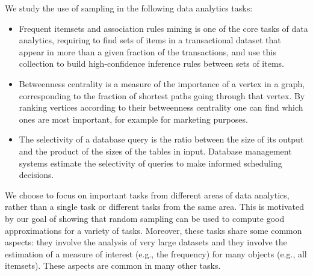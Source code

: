 We study the use of sampling in the following data analytics tasks:
\begin{itemize}
  \item Frequent itemsets and association rules mining is one of the core tasks
    of data analytics, requiring to find sets of items in a transactional
    dataset that appear in more than a given fraction of the transactions, and
    use this collection to build high-confidence inference rules between sets of
    items.
  \item Betweenness centrality is a measure of the importance of a vertex in a
    graph, corresponding to the fraction of shortest paths going through that
    vertex. By ranking vertices according to their betweenness centrality one
    can find which ones are most important, for example for marketing purposes.
  \item The selectivity of a database query is the ratio between the size of its
    output and the product of the sizes of the tables in input. Database
    management systems estimate the selectivity of queries to make informed
    scheduling decisions.
\end{itemize}
We choose to focus on important tasks from different areas of data analytics,
rather than a single task or different tasks from the same area. This is
motivated by our goal of showing that random sampling can be used to compute
good approximations for a variety of tasks. Moreover, these tasks share some
common aspects: they involve the analysis of very large datasets and they
involve the estimation of a measure of interest (e.g., the frequency) for many
objects (e.g., all itemsets). These aspects are common in many other tasks.

